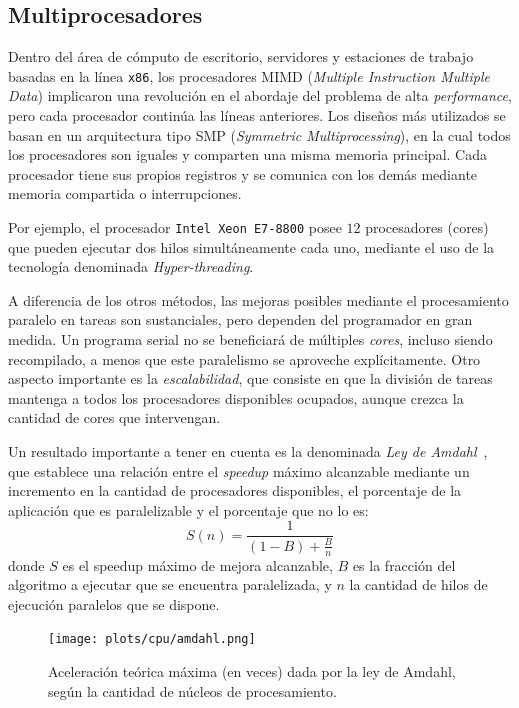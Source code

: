 \subsection{Multiprocesadores}

Dentro del \'area de c\'omputo de escritorio, servidores y estaciones de trabajo basadas en la l\'inea \texttt{x86}, los procesadores MIMD (\textit{Multiple Instruction Multiple Data}) implicaron una revoluci\'on en el abordaje del problema de alta \textit{performance}, pero cada procesador contin\'ua las l\'ineas anteriores.
Los dise\~nos m\'as utilizados se basan en un arquitectura tipo SMP (\textit{Symmetric Multiprocessing}), en la cual todos los procesadores son iguales y comparten una misma memoria principal.
Cada procesador tiene sus propios registros y se comunica con los dem\'as mediante memoria compartida o interrupciones.

Por ejemplo, el procesador \texttt{Intel Xeon E7-8800} posee $12$ procesadores (cores) que pueden ejecutar dos hilos simult\'aneamente cada uno, mediante el uso de la tecnolog\'ia denominada \textit{Hyper-threading}.

A diferencia de los otros m\'etodos, las mejoras posibles mediante el procesamiento paralelo en tareas son sustanciales, pero dependen del programador en gran medida.
Un programa serial no se beneficiar\'a de m\'ultiples \textit{cores}, incluso siendo recompilado, a menos que este paralelismo se aproveche expl\'icitamente.
Otro aspecto importante es la \textit{escalabilidad}, que consiste en que la divisi\'on de tareas mantenga a todos los procesadores disponibles ocupados, aunque crezca la cantidad de cores que intervengan.

Un resultado importante a tener en cuenta es la denominada \textit{Ley de Amdahl}~\cite{Amdahl1967}, que establece una relaci\'on entre el \textit{speedup} m\'aximo alcanzable mediante un incremento en la cantidad de procesadores disponibles, el porcentaje de la aplicaci\'on que es paralelizable y el porcentaje que no lo es:
\begin{equation}
    \label{eq:amdahl}
    S(n) = \frac{1}{(1 - B) + \frac{B}{n}}
\end{equation}
donde $S$ es el speedup m\'aximo de mejora alcanzable, $B$ es la fracci\'on del algoritmo a ejecutar que se encuentra paralelizada, y $n$ la cantidad de hilos de ejecuci\'on paralelos que se dispone.

\begin{figure}[htbp]
    \centering
    \texttt{[image: plots/cpu/amdahl.png]}
    \caption{Aceleraci\'on te\'orica m\'axima (en veces) dada por la ley de Amdahl, seg\'un la cantidad de n\'ucleos de procesamiento.}
    \label{fig:amdahl_plot}
\end{figure}

